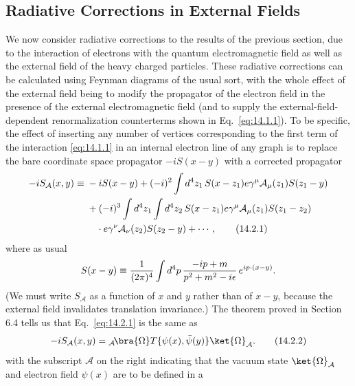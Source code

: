 
\subsection{Radiative Corrections in External Fields}

We now consider radiative corrections to the results of the previous section,
due to the interaction of electrons with the quantum electromagnetic field
as well as the external field of the heavy charged particles. These radiative
corrections can be calculated using Feynman diagrams of the usual sort,
with the whole effect of the external field being to modify the propagator
of the electron field in the presence of the external electromagnetic field
(and to supply the external-field-dependent renormalization counterterms
shown in Eq.~\eqref{eq:14.1.1}). To be specific, the effect of inserting any number
of vertices corresponding to the first term of the interaction \eqref{eq:14.1.1} in an
internal electron line of any graph is to replace the bare coordinate space
propagator $-iS(x-y)$ with a corrected propagator
\begin{align}
 -iS_{\mathcal A}(x,y)\equiv{}&-iS(x-y)
 +(-i)^2\int d^4z_1\,S(x-z_1)e\gamma^\mu\mathcal A_\mu(z_1)S(z_1-y)
 \notag\\
 &+(-i)^3\int d^4z_1\int d^4z_2\,
 S(x-z_1)e\gamma^\mu\mathcal A_\mu(z_1)S(z_1-z_2)
 \notag\\
 &\quad\cdot e\gamma^\nu\mathcal A_\nu(z_2)S(z_2-y)+\cdots ,
 \tag{14.2.1}\label{eq:14.2.1}
\end{align}
where as usual
\[
 S(x-y)\equiv\frac{1}{(2\pi)^4}\int d^4p\,
 \frac{-i\sl{p}+m}{p^2+m^2-i\epsilon}\,e^{ip\cdot(x-y)}.
\]
(We must write $S_{\mathcal A}$ as a function of $x$ and $y$ rather than of
$x-y$, because the external field invalidates translation invariance.) The
theorem proved in Section 6.4 tells us that Eq.~\eqref{eq:14.2.1} is the same as
\begin{equation}
 -iS_{\mathcal A}(x,y)
 ={}_{\mathcal A}\!\bra{\Omega}T\{\psi(x),\bar\psi(y)\}\ket{\Omega}_{\mathcal A}.
 \tag{14.2.2}\label{eq:14.2.2}
\end{equation}
with the subscript $\mathcal A$ on the right indicating that the vacuum state
$\ket{\Omega}_{\mathcal A}$ and electron field $\psi(x)$ are to be defined in a
